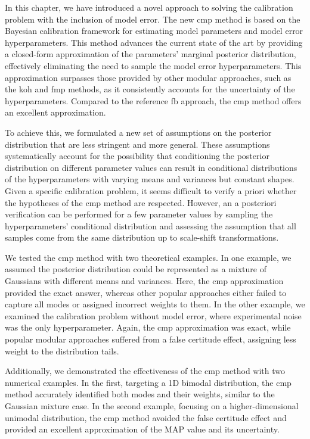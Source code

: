 In this chapter, we have introduced a novel approach to solving the calibration problem with the inclusion of model error. The new \gls{cmp} method is based on the Bayesian calibration framework for estimating model parameters and model error hyperparameters. This method advances the current state of the art by providing a closed-form approximation of the parameters' marginal posterior distribution, effectively eliminating the need to sample the model error hyperparameters. This approximation surpasses those provided by other modular approaches, such as the \gls{koh} and \gls{fmp} methods, as it consistently accounts for the uncertainty of the hyperparameters. Compared to the reference \gls{fb} approach, the \gls{cmp} method offers an excellent approximation.

\smallskip
To achieve this, we formulated a new set of assumptions on the posterior distribution that are less stringent and more general. These assumptions systematically account for the possibility that conditioning the posterior distribution on different parameter values can result in conditional distributions of the hyperparameters with varying means and variances but constant shapes. Given a specific calibration problem, it seems difficult to verify a priori whether the hypotheses of the \gls{cmp} method are respected. However, an a posteriori verification can be performed for a few parameter values by sampling the hyperparameters' conditional distribution and assessing the assumption that all samples come from the same distribution up to scale-shift transformations.

We tested the \gls{cmp} method with two theoretical examples. In one example, we assumed the posterior distribution could be represented as a mixture of Gaussians with different means and variances. Here, the \gls{cmp} approximation provided the exact answer, whereas other popular approaches either failed to capture all modes or assigned incorrect weights to them. In the other example, we examined the calibration problem without model error, where experimental noise was the only hyperparameter. Again, the \gls{cmp} approximation was exact, while popular modular approaches suffered from a false certitude effect, assigning less weight to the distribution tails.

Additionally, we demonstrated the effectiveness of the \gls{cmp} method with two numerical examples. In the first, targeting a 1D bimodal distribution, the \gls{cmp} method accurately identified both modes and their weights, similar to the Gaussian mixture case. In the second example, focusing on a higher-dimensional unimodal distribution, the \gls{cmp} method avoided the false certitude effect and provided an excellent approximation of the MAP value and its uncertainty.

